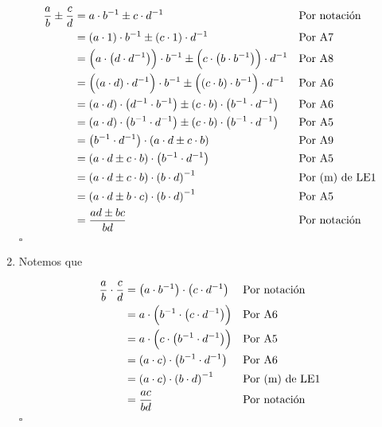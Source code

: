 \documentclass[11pt]{article}
\begin{document}
\begin{enumerate}[label=\alph*),font=\bfseries]
\begin{align*}
\frac{a}{b} \pm \frac{c}{d}  &=	a \cdot b^{-1} \pm c \cdot d^{-1} && \text{Por notación}\\
&=	\left( a \cdot 1 \right)   \cdot b^{-1} \pm \left( c \cdot 1 \right) \cdot d^{-1} && \text{Por A7}\\
&=	\Bigl( a \cdot  \left( d \cdot d^{-1} \right) \Bigr) \cdot b^{-1} \pm \Bigl( c \cdot  \left( b \cdot b^{-1}  \right)  \Bigr)  \cdot d^{-1} && \text{Por A8}\\
&=	\Bigl(  \left( a \cdot d \right) \cdot d^{-1} \Bigr) \cdot b^{-1} \pm \Bigl(  \left( c \cdot b \right) \cdot b^{-1} \Bigr) \cdot d^{-1} && \text{Por A6}\\
&=	\left( a \cdot d \right)  \cdot  \left( d^{-1} \cdot b^{-1}  \right) \pm \left( c \cdot b \right)  \cdot  \left( b^{-1} \cdot d^{-1}  \right) && \text{Por A6}\\
&=	\left( a \cdot d \right)  \cdot  \left( b^{-1} \cdot d^{-1}  \right) \pm \left( c \cdot b \right)  \cdot  \left( b^{-1} \cdot d^{-1}  \right) && \text{Por A5}\\
&=	\left( b^{-1} \cdot d^{-1}  \right) \cdot \left( a \cdot d \pm c \cdot b \right) && \text{Por A9}\\
&=	\left( a \cdot d \pm c \cdot b \right) \cdot  \left( b^{-1} \cdot d^{-1} \right) && \text{Por A5}\\
&=	\left( a \cdot d \pm c \cdot b \right) \cdot  \left( b \cdot d \right)^{-1} && \text{Por (m) de LE1}\\
&=	\left( a \cdot d \pm b \cdot c \right) \cdot \left( b \cdot d \right)^{-1} && \text{Por A5}\\
&=	\frac{ad \pm bc}{bd} && \text{Por notación}\\
\end{align*}
\mbox{}\hfill $\square$


\item Notemos que

\begin{align*}
    \frac{a}{b} \cdot \frac{c}{d} &= \left( a \cdot b^{-1} \right) \cdot \left( c \cdot d^{-1} \right) && \text{Por notación}\\
        &= a \cdot \Bigl( b^{-1} \cdot \left( c \cdot d^{-1} \right) \Bigr) && \text{Por A6}\\
            &= a \cdot \Bigl( c \cdot \left( b^{-1} \cdot d^{-1} \right) \Bigr) && \text{Por A5}\\
	&= \left( a \cdot c \right) \cdot \left( b^{-1} \cdot d^{-1} \right) && \text{Por A6}\\
	&= \left( a \cdot c \right) \cdot \left( b \cdot d \right)^{-1} && \text{Por (m) de LE1}\\
	&= \frac{ac}{bd} && \text{Por notación}\\
\end{align*}
\mbox{}\hfill $\square$


\end{enumerate}
\end{document}
